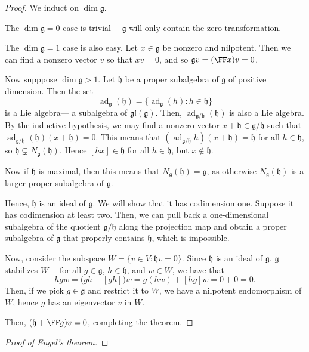 \documentclass{article}
\newcommand{\lb}[1]{\ensuremath{\left[{#1}\right]}}
\DeclareMathOperator{\ad}{ad}
\newcommand{\frkg}{{\ensuremath{\mathfrak{g}}}}
\newcommand{\frkh}{{\ensuremath{\mathfrak{h}}}}
\newcommand{\glalg}{\ensuremath{\mathfrak{gl}}}
\begin{document}
\begin{proof}
    We induct on $\dim \frkg$.

    The $\dim \frkg = 0$ case is trivial--- $\frkg$ will only contain the zero transformation.

    The $\dim \frkg = 1$ case is also easy.
    Let $x \in \frkg$ be nonzero and nilpotent.
    Then  we can find a nonzero vector $v$ so that $xv = 0$, and so $\frkg v = (\FF x)v = 0$.

    Now supppose $\dim \frkg > 1$.
    Let $\frkh$ be a proper subalgebra of $\frkg$ of positive dimension.
    Then the set
    \[
        \ad_\frkg(\frkh)
        =
        \Big\{
            \ad_\frkg(h) : h \in \frkh
        \Big\}
    \]
    is a Lie algebra--- a subalgebra of $\glalg(\frkg)$.
    Then, $\ad_{\frkg/\frkh}(\frkh)$ is also a Lie algebra.
    By the inductive hypothesis, we may find a nonzero vector $x + \frkh \in \frkg/\frkh$ such that $\ad_{\frkg/\frkh}(\frkh)(x + \frkh) = 0$.
    This means that $(\ad_{\frkg/\frkh} h)(x + \frkh) = \frkh$ for all $h \in \frkh$, so $\frkh \subsetneq N_\frkg(\frkh)$.
    Hence $[hx] \in \frkh$ for all $h \in \frkh$, but $x \notin \frkh$.

    Now if $\frkh$ is maximal, then this means that $N_\frkg(\frkh) = \frkg$, as otherwise $N_\frkg(\frkh)$ is a larger proper subalgebra of $\frkg$.

    Hence, $\frkh$ is an ideal of $\frkg$.
    We will show that it has codimension one.
    Suppose it has codimension at least two.
    Then, we can pull back a one-dimensional subalgebra of the quotient $\frkg / \frkh$ along the projection map and obtain a proper subalgebra of $\frkg$ that properly contains $\frkh$, which is impossible.

    Now, consider the subspace $W = \{ v \in V : \frkh v = 0 \}$.
    Since $\frkh$ is an ideal of $\frkg$, $\frkg$ stabilizes $W$--- for all $g \in \frkg$, $h \in \frkh$, and $w \in W$, we have that
    \[
        hgw
        = 
        \Big(gh - \lb{gh}\Big)w
        =
        g(hw) + \lb{hg}w
        =
        0 + 0
        =
        0.
    \]
    Then, if we pick $g \in \frkg$ and restrict it to $W$, we have a nilpotent endomorphism of $W$, hence $g$ has an eigenvector $v$ in $W$.

    Then, $(\frkh + \FF g)v = 0$, completing the theorem.
\end{proof}

\begin{proof}[Proof of Engel's theorem]

\end{proof}
\end{document}
